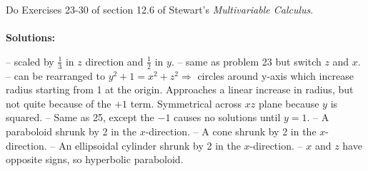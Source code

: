 \documentclass[12pt]{exam}
\begin{document}
\begin{questions}
\clearpage
\question Do Exercises 23-30 of section 12.6 of Stewart’s \textit{Multivariable Calculus}.
	\\\\\textbf{Solutions:}
	\begin{questions}
		\setcounter{question}{22}
		\question {} -- scaled by $\frac{1}{3}$ in $z$ direction and $\frac{1}{2}$ in $y$.
		\question {} -- same as problem 23 but switch $z$ and $x$.
		\question {} -- can be rearranged to $y^2+1=x^2+z^2 \Rightarrow$ circles around y-axis which increase radius starting from 1 at the origin. Approaches a linear increase in radius, but not quite because of the $+1$ term. Symmetrical across $xz$ plane because $y$ is squared.
		\question {} -- Same as 25, except the $-1$ causes no solutions until $y=1$. 
		\question {} -- A paraboloid shrunk by 2 in the $x$-direction.
		\question {} -- A cone shrunk by 2 in the $x$-direction.
		\question {} -- An ellipsoidal cylinder shrunk by 2 in the $x$-direction.
		\question {} -- $x$ and $z$ have opposite signs, so hyperbolic paraboloid.
	\end{questions}
\clearpage
\setcounter{question}{6}
\question
\end{questions}
\end{document}

